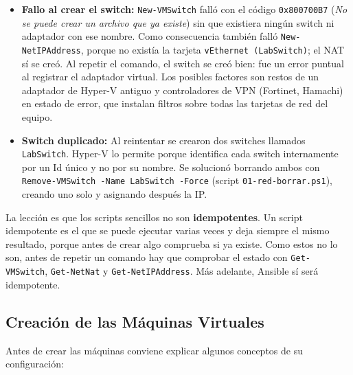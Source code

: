 \documentclass[11pt, a4paper, titlepage]{article}
\newcommand{\cod}[1]{\texttt{#1}}
\begin{document}
\begin{itemize}
    \item \textbf{Fallo al crear el switch:} \cod{New-VMSwitch} falló con el código \cod{0x800700B7} (\textit{No se puede crear un archivo que ya existe}) sin que existiera ningún switch ni adaptador con ese nombre. Como consecuencia también falló \cod{New-NetIPAddress}, porque no existía la tarjeta \cod{vEthernet (LabSwitch)}; el NAT sí se creó. Al repetir el comando, el switch se creó bien: fue un error puntual al registrar el adaptador virtual. Los posibles factores son restos de un adaptador de Hyper-V antiguo y controladores de VPN (Fortinet, Hamachi) en estado de error, que instalan filtros sobre todas las tarjetas de red del equipo.

    \item \textbf{Switch duplicado:} Al reintentar se crearon dos switches llamados \cod{LabSwitch}. Hyper-V lo permite porque identifica cada switch internamente por un Id único y no por su nombre. Se solucionó borrando ambos con \cod{Remove-VMSwitch -Name LabSwitch -Force} (script \cod{01-red-borrar.ps1}), creando uno solo y asignando después la IP.
\end{itemize}

La lección es que los scripts sencillos no son \textbf{idempotentes}. Un script idempotente es el que se puede ejecutar varias veces y deja siempre el mismo resultado, porque antes de crear algo comprueba si ya existe. Como estos no lo son, antes de repetir un comando hay que comprobar el estado con \cod{Get-VMSwitch}, \cod{Get-NetNat} y \cod{Get-NetIPAddress}. Más adelante, Ansible sí será idempotente.

\subsection{Creación de las Máquinas Virtuales}
\label{sec:vms}

Antes de crear las máquinas conviene explicar algunos conceptos de su configuración:
\end{document}
